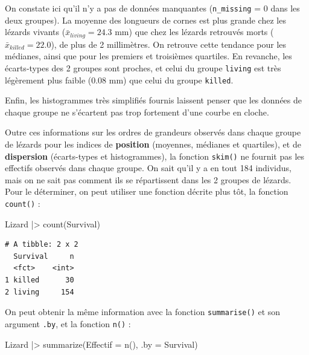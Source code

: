 \documentclass[
  french,
  a4paper,
  DIV=11,
  numbers=noendperiod,
  oneside]{scrreprt}
\newenvironment{Shaded}{}{}
\newcommand{\AttributeTok}[1]{\textcolor[rgb]{0.84,0.23,0.29}{#1}}
\newcommand{\FunctionTok}[1]{\textcolor[rgb]{0.44,0.26,0.76}{#1}}
\newcommand{\NormalTok}[1]{\textcolor[rgb]{0.14,0.16,0.18}{#1}}
\newcommand{\SpecialCharTok}[1]{\textcolor[rgb]{0.00,0.36,0.77}{#1}}
\begin{document}
On constate ici qu'il n'y a pas de données manquantes
(\texttt{n\_missing} = 0 dans les deux groupes). La moyenne des
longueurs de cornes est plus grande chez les lézards vivants
(\(\bar{x}_{living} = 24.3\) mm) que chez les lézards retrouvés morts
(\(\bar{x}_{killed} = 22.0\)), de plus de 2 millimètres. On retrouve
cette tendance pour les médianes, ainsi que pour les premiers et
troisièmes quartiles. En revanche, les écarts-types des 2 groupes sont
proches, et celui du groupe \texttt{living} est très légèrement plus
faible (0.08 mm) que celui du groupe \texttt{killed}.

Enfin, les histogrammes très simplifiés fournis laissent penser que les
données de chaque groupe ne s'écartent pas trop fortement d'une courbe
en cloche.

Outre ces informations sur les ordres de grandeurs observés dans chaque
groupe de lézards pour les indices de \textbf{position} (moyennes,
médianes et quartiles), et de \textbf{dispersion} (écarts-types et
histogrammes), la fonction \texttt{skim()} ne fournit pas les effectifs
observés dans chaque groupe. On sait qu'il y a en tout 184 individus,
mais on ne sait pas comment ils se répartissent dans les 2 groupes de
lézards. Pour le déterminer, on peut utiliser une fonction décrite plus
tôt, la fonction \texttt{count()} :

\begin{Shaded}
\begin{Highlighting}[]
\NormalTok{Lizard }\SpecialCharTok{|\textgreater{}}
  \FunctionTok{count}\NormalTok{(Survival)}
\end{Highlighting}
\end{Shaded}

\begin{verbatim}
# A tibble: 2 x 2
  Survival     n
  <fct>    <int>
1 killed      30
2 living     154
\end{verbatim}

On peut obtenir la même information avec la fonction
\texttt{summarise()} et son argument \texttt{.by}, et la fonction
\texttt{n()} :

\begin{Shaded}
\begin{Highlighting}[]
\NormalTok{Lizard }\SpecialCharTok{|\textgreater{}} 
  \FunctionTok{summarize}\NormalTok{(}\AttributeTok{Effectif =} \FunctionTok{n}\NormalTok{(), }\AttributeTok{.by =}\NormalTok{ Survival)}
\end{Highlighting}
\end{Shaded}
\end{document}
